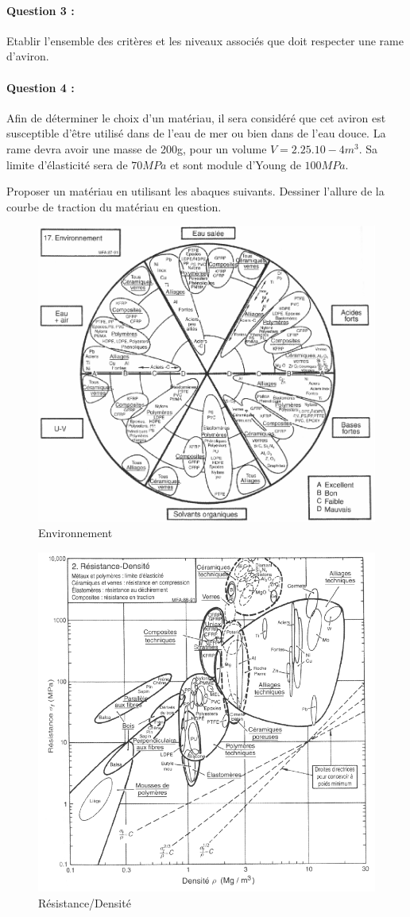 \paragraph{Question 3 :} Etablir l'ensemble des critères et les niveaux associés que doit respecter une rame d'aviron. 

\paragraph{Question 4 :} Afin de déterminer le choix d'un matériau, il sera considéré que cet aviron est susceptible d'être utilisé dans de l'eau de mer ou bien dans de l'eau douce. La rame devra avoir une  masse de 200g, pour un volume $V=2.25.10-4 m^3$. Sa limite d'élasticité sera de $70 MPa$ et sont module d'Young de $100 MPa$. 
 
Proposer un matériau en utilisant les abaques suivants. Dessiner l'allure de la courbe de traction du matériau en question. 

\begin{figure}[!h] 
  \centering\includegraphics[width=0.7\linewidth]{img/ab1.png}
  \caption{Environnement}
  \label{img:image6}
\end{figure}

\begin{figure}[!h] 
  \centering\includegraphics[width=0.65\linewidth]{img/ab2.png}
  \caption{Résistance/Densité}
  \label{img:image7}
\end{figure}

